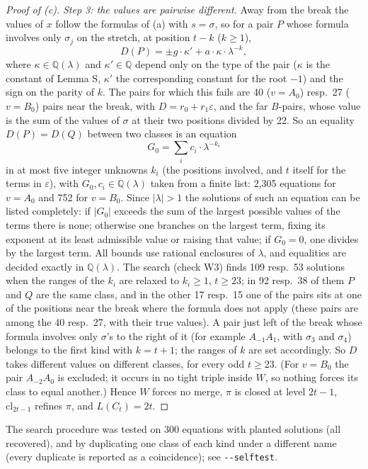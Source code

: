 \documentclass[11pt,a4paper]{article}
\theoremstyle{definition}
\theoremstyle{remark}
\newcommand{\cl}{\mathrm{cl}}
\newcommand{\Q}{\mathbb{Q}}
\newcommand{\eps}{\varepsilon}
\newcommand{\file}[1]{\texttt{#1}}
\newcommand{\step}[1]{\smallskip\noindent\emph{#1}}
\begin{document}
\begin{proof}[Proof of (c)]
\step{Step 3: the values are pairwise different.} Away from the break the values of $x$ follow the formulas of (a)
with $s = \sigma$, so for a pair $P$ whose formula involves only $\sigma_j$ on the stretch, at position $t - k$
($k \ge 1$),
\[
  D(P) = \pm g\cdot\kappa' + a\cdot\kappa\cdot\lambda^{-k},
\]
where $\kappa \in \Q(\lambda)$ and $\kappa' \in \Q$ depend only on the type of the pair ($\kappa$ is the constant of
Lemma S, $\kappa'$ the corresponding constant for the root $-1$) and the sign on the parity of $k$. The pairs for
which this fails are 40 ($v = A_0$) resp.\ 27 ($v = B_0$) pairs near the break, with $D = r_0 + r_1\eps$, and the
far $B$-pairs, whose value is the sum of the values of $\sigma$ at their two positions divided by 22. So an equality
$D(P) = D(Q)$ between two classes is an equation
\[
  G_0 = \sum_i c_i\cdot\lambda^{-k_i}
\]
in at most five integer unknowns $k_i$ (the positions involved, and $t$ itself for the terms in $\eps$), with
$G_0, c_i \in \Q(\lambda)$ taken from a finite list: 2,305 equations for $v = A_0$ and 752 for $v = B_0$. Since
$|\lambda| > 1$ the solutions of such an equation can be listed completely: if $|G_0|$ exceeds the sum of the
largest possible values of the terms there is none; otherwise one branches on the largest term, fixing its exponent
at its least admissible value or raising that value; if $G_0 = 0$, one divides by the largest term. All bounds use
rational enclosures of $\lambda$, and equalities are decided exactly in $\Q(\lambda)$. The search (check W3) finds
109 resp.\ 53 solutions when the ranges of the $k_i$ are relaxed to $k_i \ge 1$, $t \ge 23$; in 92 resp.\ 38 of them
$P$ and $Q$ are the same class, and in the other 17 resp.\ 15 one of the pairs sits at one of the positions near
the break where the formula does not apply (these pairs are among the 40 resp.\ 27, with their true values). A pair
just left of the break whose formula involves only $\sigma$'s to the right of it (for example $A_{-1}A_1$, with
$\sigma_3$ and $\sigma_4$) belongs to the first kind with $k = t + 1$; the ranges of $k$ are set accordingly. So $D$
takes different values on different classes, for every odd $t \ge 23$. (For $v = B_0$ the pair $A_{-2}A_0$ is
excluded; it occurs in no tight triple inside $W$, so nothing forces its class to equal another.) Hence $W$ forces
no merge, $\pi$ is closed at level $2t - 1$, $\cl_{2t-1}$ refines $\pi$, and $L(C_t) = 2t$.
\end{proof}

The search procedure was tested on 300 equations with planted solutions (all recovered), and by duplicating one
class of each kind under a different name (every duplicate is reported as a coincidence); see \file{-{}-selftest}.
\end{document}
